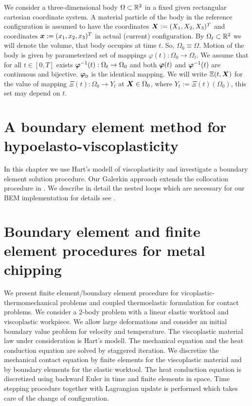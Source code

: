 \documentclass[12pt,a4paper]{scrbook}
\begin{document}
\def \benchmarkMetalChipping{/home/gein/Documents/tex/SPP1180/Kolloquium.7_8.Juni}

We consider a three-dimensional body $\Omega\subset{\mathbb R}^2$ in a fixed given rectangular cartesian coordinate system. A material particle of the body in the reference configuration is assumed to have the coordinates $\mbox{\boldmath$X$}:=(X_1,X_2,X_3)^T$ and coordinates $\mbox{\boldmath$x$}:=(x_1,x_2,x_3)^T$ in actual (current) configuration. By $\Omega_t\subset{\mathbb R}^2$ we will denote the volume, that body occupies at time $t$. So, $\Omega_0\equiv\Omega$. Motion of the body is given by parameterized set of mappings $\varphi(t): \Omega_0\rightarrow \Omega_t$. We assume that for all $t\in[0,T]$ exists $\mbox{\boldmath$\varphi$}^{-1}(t):\Omega_t\rightarrow \Omega_0$ and both $\mbox{\boldmath$\varphi$}(t)$ and $\mbox{\boldmath$\varphi$}^{-1}(t)$ are continuous and bijective. $\mbox{\boldmath$\varphi$}_0$ is the identical mapping. We will write $\Xi(t,\mbox{\boldmath$X$})$ for the value of mapping $\Xi(t):\Omega_0\rightarrow Y_t$ at $\mbox{\boldmath$X$}\in\Omega_0$, where $Y_t:=\Xi(t)(\Omega_0)$, this set may depend on $t$.\\
\section{A boundary element method for hypoelasto-viscoplasticity}\label{sec:BEM_HyperElasto_VP}

In this chapter we use Hart's modell of viscoplasticity and investigate a boundary element solution procedure. Our  Galerkin approach extends the collocation procedure in \cite{MuCha84,Mu82}. We describe in detail the nested loops which are necessary for our BEM implementation for details see \cite{DonigaDipl05}. 



% 
% 


\section{Boundary element and finite element procedures for metal chipping}\label{sec:FEMBEM_HyperElasto_VP}
We present  finite element/boundary element procedure for  vicoplastic-thermomechanical problems and coupled thermoelastic formulation for contact problems. We consider a 2-body problem with a linear elastic worktool and viscoplastic workpiece. We allow  large deformations and consider an initial boundary value problem for  velocity and temperature. The viscoplastic material law under consideration is Hart's modell. The mechanical equation and the heat conduction equation are solved by staggered iteration. We discretize the mechanical contact equation by finite elements for the viscoplastic material and by boundary elements for the elastic worktool. The heat conduction equation is discretized using backward Euler in time and finite elements in space. Time stepping procedure together with Lagrangian update  is performed which takes care of the change of configuration. 
\end{document}
